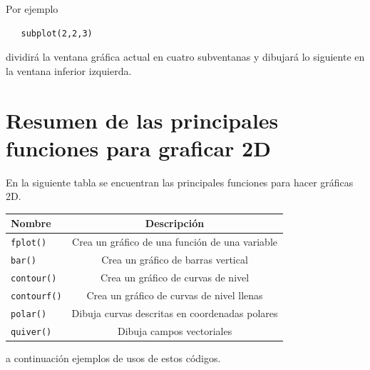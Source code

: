 \documentclass[11pt]{article}
\begin{document}
  Por ejemplo
  \begin{verbatim}
   subplot(2,2,3)
  \end{verbatim}
  dividir\'a la ventana gr\'afica actual en cuatro subventanas y dibujar\'a lo siguiente en la ventana 
  inferior izquierda.
 
  \section{Resumen de las principales funciones para graficar 2D}

 En la siguiente tabla se encuentran las principales funciones para hacer gr\'aficas 2D.

 \begin{center}
 \begin{tabular}{|p{2cm}|c||}
 Nombre				& Descripci\'on			\\
 \hline 
  \texttt{fplot()}		& Crea un gr\'afico de una funci\'on de una variable\\
  \texttt{bar()}		& Crea un gr\'afico de barras vertical\\
  \texttt{contour()}		& Crea un gr\'afico de curvas de nivel\\
  \texttt{contourf()}		& Crea un gr\'afico de curvas de nivel llenas\\
  \texttt{polar()}		& Dibuja curvas descritas en coordenadas polares\\
  \texttt{quiver()}		& Dibuja campos vectoriales\\
 \end{tabular}
 \end{center}
 
 a continuaci\'on ejemplos de usos de estos c\'odigos.
 
\end{document}

